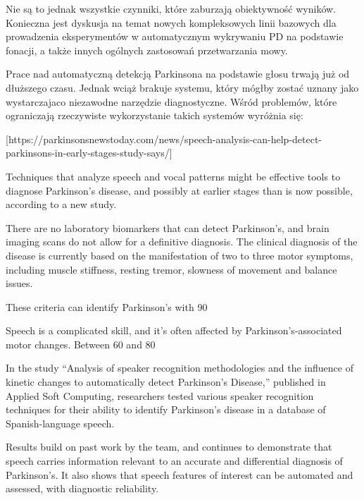 Nie są to jednak wszystkie czynniki, które zaburzają obiektywność wyników. Konieczna jest dyskusja na temat nowych
kompleksowych linii bazowych dla prowadzenia eksperymentów w automatycznym wykrywaniu PD na podstawie fonacji,
a także innych ogólnych zastosowań przetwarzania mowy.

Prace nad automatyczną detekcją Parkinsona na podstawie głosu trwają już od dłuższego czasu.
Jednak wciąż brakuje systemu, który mógłby zostać uznany jako wystarczajaco niezawodne narzędzie diagnostyczne.
Wśród problemów, które ograniczają rzeczywiste wykorzystanie takich systemów wyróżnia się:

[https://parkinsonsnewstoday.com/news/speech-analysis-can-help-detect-parkinsons-in-early-stages-study-says/]

Techniques that analyze speech and vocal patterns might be effective tools to diagnose Parkinson’s disease, and possibly at earlier stages than is now possible, according to a new study.

There are no laboratory biomarkers that can detect Parkinson’s, and brain imaging scans do not allow for a definitive diagnosis. The clinical diagnosis of the disease is currently based on the manifestation of two to three motor symptoms, including muscle stiffness, resting tremor, slowness of movement and balance issues.

These criteria can identify Parkinson’s with 90%

Speech is a complicated skill, and it’s often affected by Parkinson’s-associated motor changes. Between 60 and 80%

In the study “Analysis of speaker recognition methodologies and the influence of kinetic changes to automatically detect Parkinson’s Disease,” published in Applied Soft Computing, researchers tested various speaker recognition techniques for their ability to identify Parkinson’s disease in a database of Spanish-language speech.

Results build on past work by the team, and continues to demonstrate that speech carries information relevant to an accurate and differential diagnosis of Parkinson’s. It also shows that speech features of interest can be automated and assessed, with diagnostic reliability.

